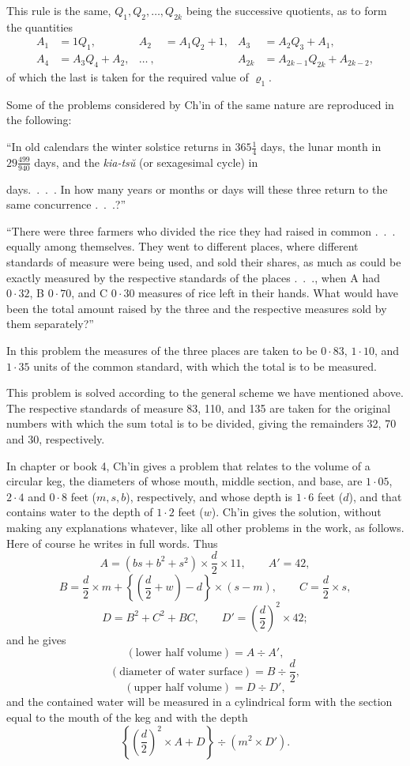 \documentclass[11pt]{article}
\newcommand{\scanpage}[2]{\clearpage\setcounter{footnote}{0}\noindent{\footnotesize\color{gray}PDF page #1 · #2}\par\medskip}
\newcommand{\scanfooter}{}
\begin{document}
This rule is the same, $Q_1,Q_2,\ldots,Q_{2k}$ being the successive quotients, as to form the quantities
\[
\begin{aligned}
A_1&=1Q_1, & A_2&=A_1Q_2+1, & A_3&=A_2Q_3+A_1,\\
A_4&=A_3Q_4+A_2, & \ldots\ ,&& A_{2k}&=A_{2k-1}Q_{2k}+A_{2k-2},
\end{aligned}
\]
of which the last is taken for the required value of $\varrho_1$.

Some of the problems considered by Ch'in of the same nature are reproduced in the following:

``In old calendars the winter solstice returns in $365\frac14$ days, the lunar month in $29\frac{499}{940}$ days, and the \emph{kia-tsŭ} (or sexagesimal cycle) in
\scanfooter

\scanpage{0083}{Chapter 11, printed page 69}
60 days.\ .\ .\ . In how many years or months or days will these three return to the same concurrence .\ .\ .?''

``There were three farmers who divided the rice they had raised in common .\ .\ . equally among themselves. They went to different places, where different standards of measure were being used, and sold their shares, as much as could be exactly measured by the respective standards of the places .\ .\ ., when A had $0\cdot32$, B $0\cdot70$, and C $0\cdot30$ measures of rice left in their hands. What would have been the total amount raised by the three and the respective measures sold by them separately?''

In this problem the measures of the three places are taken to be $0\cdot83$, $1\cdot10$, and $1\cdot35$ units of the common standard, with which the total is to be measured.

This problem is solved according to the general scheme we have mentioned above. The respective standards of measure 83, 110, and 135 are taken for the original numbers with which the sum total is to be divided, giving the remainders 32, 70 and 30, respectively.

In chapter or book 4, Ch'in gives a problem that relates to the volume of a circular keg, the diameters of whose mouth, middle section, and base, are $1\cdot05$, $2\cdot4$ and $0\cdot8$ feet ($m,s,b$), respectively, and whose depth is $1\cdot6$ feet ($d$), and that contains water to the depth of $1\cdot2$ feet ($w$). Ch'in gives the solution, without making any explanations whatever, like all other problems in the work, as follows. Here of course he writes in full words. Thus
\[
A=(bs+b^2+s^2)\times\frac d2\times11,\qquad A'=42,
\]
\[
B=\frac d2\times m+\left\{\left(\frac d2+w\right)-d\right\}\times(s-m),
\qquad C=\frac d2\times s,
\]
\[
D=B^2+C^2+BC,\qquad D'=\left(\frac d2\right)^2\times42;
\]
and he gives
\[
(\text{lower half volume})=A\div A',
\]
\[
(\text{diameter of water surface})=B\div\frac d2,
\]
\[
(\text{upper half volume})=D\div D',
\]
and the contained water will be measured in a cylindrical form with the section equal to the mouth of the keg and with the depth
\[
\left\{\left(\frac d2\right)^2\times A+D\right\}\div(m^2\times D').
\]
\scanfooter
\end{document}
